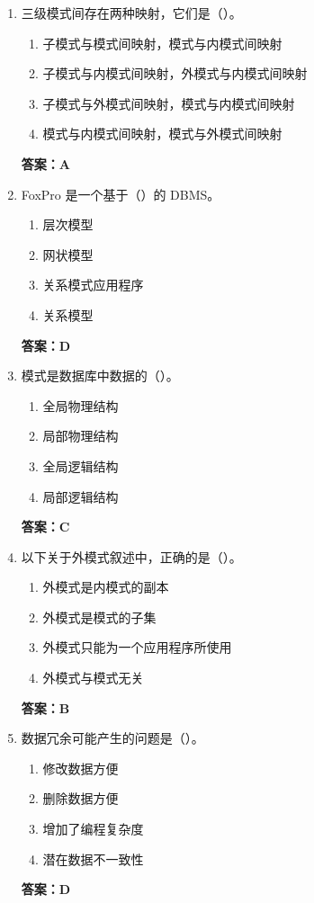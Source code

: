 \documentclass[12pt, a4paper]{article}
\begin{document}
\begin{enumerate}[label=\arabic*.]
	\item 三级模式间存在两种映射，它们是（\quad）。
	      \begin{enumerate}
		      \item 子模式与模式间映射，模式与内模式间映射
		      \item 子模式与内模式间映射，外模式与内模式间映射
		      \item 子模式与外模式间映射，模式与内模式间映射
		      \item 模式与内模式间映射，模式与外模式间映射
	      \end{enumerate}
	      \textbf{答案：A}

	\item FoxPro 是一个基于（\quad）的 DBMS。
	      \begin{enumerate}
		      \item 层次模型
		      \item 网状模型
		      \item 关系模式应用程序
		      \item 关系模型
	      \end{enumerate}
	      \textbf{答案：D}

	\item 模式是数据库中数据的（\quad）。
	      \begin{enumerate}
		      \item 全局物理结构
		      \item 局部物理结构
		      \item 全局逻辑结构
		      \item 局部逻辑结构
	      \end{enumerate}
	      \textbf{答案：C}

	\item 以下关于外模式叙述中，正确的是（\quad）。
	      \begin{enumerate}
		      \item 外模式是内模式的副本
		      \item 外模式是模式的子集
		      \item 外模式只能为一个应用程序所使用
		      \item 外模式与模式无关
	      \end{enumerate}
	      \textbf{答案：B}

	\item 数据冗余可能产生的问题是（\quad）。
	      \begin{enumerate}
		      \item 修改数据方便
		      \item 删除数据方便
		      \item 增加了编程复杂度
		      \item 潜在数据不一致性
	      \end{enumerate}
	      \textbf{答案：D}


\end{enumerate}
\end{document}
